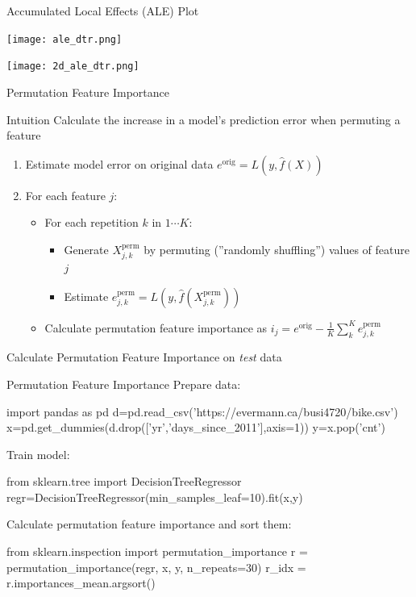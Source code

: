 \documentclass[ignorenonframetext,xcolor=x11names]{beamer}
\begin{document}
\begin{frame}{Accumulated Local Effects (ALE) Plot}
\centering 

\texttt{[image: ale\_dtr.png]} 

\texttt{[image: 2d\_ale\_dtr.png]}

\end{frame}


\begin{frame}{Permutation Feature Importance}

\begin{block}{Intuition}
Calculate the increase in a model's prediction error when permuting a feature
\end{block}

\begin{enumerate}
\item Estimate model error on original data $e^{\text{orig}} = L(y, \hat{f}(X))$
\item For each feature $j$:
  \begin{itemize}
     \item For each repetition $k$ in $1 \cdots K$:
     \begin{itemize}
        \item Generate $X^{\text{perm}}_{j, k}$ by permuting (''randomly shuffling'') values of feature $j$
        \item Estimate $e^{\text{perm}}_{j, k} = L(y, \hat{f}(X^{\text{perm}}_{j, k}))$
     \end{itemize}
     \item Calculate permutation feature importance as $i_j = e^{\text{orig}} - \frac{1}{K}\sum_k^K e^{\text{perm}}_{j, k}$
  \end{itemize}
\end{enumerate}
\begin{block}{}
Calculate Permutation Feature Importance on \emph{test} data
\end{block}
\end{frame}

\begin{frame}[fragile]{Permutation Feature Importance}
Prepare data:
\begin{pythoncode}
import pandas as pd
d=pd.read_csv('https://evermann.ca/busi4720/bike.csv')
x=pd.get_dummies(d.drop(['yr','days_since_2011'],axis=1))
y=x.pop('cnt')
\end{pythoncode}
Train model:
\begin{pythoncode}
from sklearn.tree import DecisionTreeRegressor
regr=DecisionTreeRegressor(min_samples_leaf=10).fit(x,y)
\end{pythoncode}
Calculate permutation feature importance and sort them:
\begin{pythoncode}
from sklearn.inspection import permutation_importance
r = permutation_importance(regr, x, y, n_repeats=30)
r_idx = r.importances_mean.argsort()
\end{pythoncode}
\end{frame}
\end{document}
